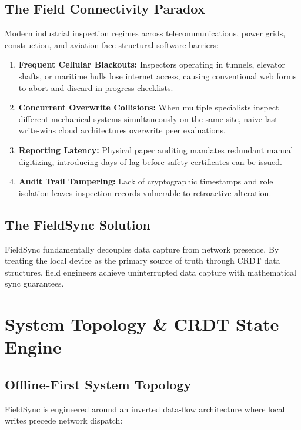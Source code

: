 \documentclass[12pt,a4paper]{report}
\begin{document}
\section{The Field Connectivity Paradox}
Modern industrial inspection regimes across telecommunications, power grids, construction, and aviation face structural software barriers:
\begin{enumerate}[nosep]
    \item \textbf{Frequent Cellular Blackouts:} Inspectors operating in tunnels, elevator shafts, or maritime hulls lose internet access, causing conventional web forms to abort and discard in-progress checklists.
    \item \textbf{Concurrent Overwrite Collisions:} When multiple specialists inspect different mechanical systems simultaneously on the same site, naive last-write-wins cloud architectures overwrite peer evaluations.
    \item \textbf{Reporting Latency:} Physical paper auditing mandates redundant manual digitizing, introducing days of lag before safety certificates can be issued.
    \item \textbf{Audit Trail Tampering:} Lack of cryptographic timestamps and role isolation leaves inspection records vulnerable to retroactive alteration.
\end{enumerate}

\section{The FieldSync Solution}
FieldSync fundamentally decouples data capture from network presence. By treating the local device as the primary source of truth through CRDT data structures, field engineers achieve uninterrupted data capture with mathematical sync guarantees.

\chapter{System Topology \& CRDT State Engine}

\section{Offline-First System Topology}
FieldSync is engineered around an inverted data-flow architecture where local writes precede network dispatch:
\end{document}
